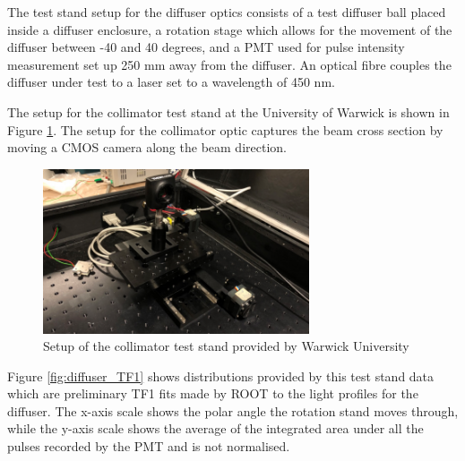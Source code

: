 The test stand setup for the diffuser optics consists of a test diffuser ball placed inside a diffuser enclosure, a rotation stage which allows for the movement of the diffuser between -40 and 40 degrees, and a PMT used for pulse intensity measurement set up 250 mm away from the diffuser. An optical fibre couples the diffuser under test to a laser set to a wavelength of 450 nm. 

The setup for the collimator test stand at the University of Warwick is shown in Figure \ref{fig:coll_test_stand}.  The setup for the collimator optic captures the beam cross section by moving a CMOS camera along the beam direction. 

\begin{figure}
    \centering
    \includegraphics[width=0.7\textwidth]{Figures/coll_test_stand.png}
    \caption{Setup of the collimator test stand provided by Warwick University}
    \label{fig:coll_test_stand}
\end{figure}

Figure \ref{fig:diffuser_TF1} shows distributions provided by this test stand data which are preliminary TF1 fits made by ROOT to the light profiles for the diffuser.  The x-axis scale shows the polar angle the rotation stand moves through, while the y-axis scale shows the average of the integrated area under all the pulses recorded by the PMT and is not normalised. 

